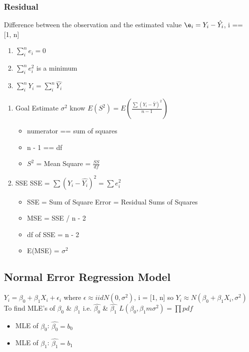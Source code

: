 \documentclass[11pt]{article}
\begin{document}
\subsubsection{Residual}
\label{sec:org41fa35d}
Difference between the observation and the estimated value
\(\e_i  = Y_i - \hat{Y_i}\), i == [1, n]
\begin{enumerate}
\item \(\sum_{i}^{n} e_i = 0\)
\item \(\sum_{i}^{n}e_i^2\) is a minimum
\item \(\sum_{i}^{n}Y_i = \sum_{i}^{n} \hat{Y_i}\)
\end{enumerate}

\begin{enumerate}
\item Goal
\label{sec:orgd421d1c}
Estimate \(\sigma^2\)
know \(E(S^2) = E(\frac{\sum(Y_i - \bar{Y})^2}{n - 1})\)
\begin{itemize}
\item numerator == sum of squares
\item n - 1 == df
\item \(S^2\) = Mean Square = \(\frac{SS}{df}\)
\end{itemize}
\item SSE
\label{sec:org788440d}
SSE = \(\sum(Y_i - \hat{Y_i})^2 = \sum e_i^2\)
\begin{itemize}
\item SSE = Sum of Square Error = Residual Sums of Squares
\item MSE = SSE / n - 2
\item df of SSE = n - 2
\item E(MSE) = \(\sigma^2\)
\end{itemize}
\end{enumerate}

\subsection{Normal Error Regression Model}
\label{sec:orgf10f3c7}
\(Y_i = \beta_0 + \beta_1 X_i + \epsilon_i\)
where
\(\epsilon \approx iid N(0,\sigma^2)\), i = [1, n]
so
\(Y_i \approx N(\beta_0 + \beta_1 X_i, \sigma^2)\)
To find MLE's of \(\beta_0\) \& \(\beta_1\) i.e. \(\hat{\beta_0}\) \& \(\hat{\beta_1}\)
\(L(\beta_0, \beta_1m \sigma^2) =\prod pdf\)
\begin{itemize}
\item MLE of \(\beta_0\): \(\hat{\beta_0} = b_0\)
\item MLE of \(\beta_1\): \(\hat{\beta_1} = b_1\)
\end{itemize}
\end{document}
